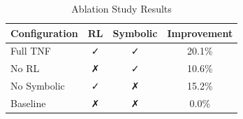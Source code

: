 \begin{table}[t]
\centering
\caption{Ablation Study Results}
\begin{tabular}{lccc}
\toprule
Configuration & RL & Symbolic & Improvement \\
\midrule
Full TNF & ✓ & ✓ & 20.1\% \\
No RL & ✗ & ✓ & 10.6\% \\
No Symbolic & ✓ & ✗ & 15.2\% \\
Baseline & ✗ & ✗ & 0.0\% \\
\bottomrule
\end{tabular}
\end{table}